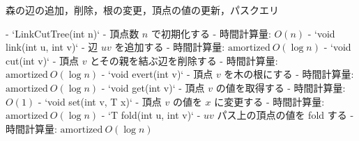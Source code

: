 \begin{small}
\begin{markdown}
森の辺の追加，削除，根の変更，頂点の値の更新，パスクエリ

- `LinkCutTree(int n)`
    - 頂点数 $n$ で初期化する
    - 時間計算量: $O(n)$
- `void link(int u, int v)`
    - 辺 $uv$ を追加する
    - 時間計算量: $\mathrm{amortized}\ O(\log n)$
- `void cut(int v)`
    - 頂点 $v$ とその親を結ぶ辺を削除する
    - 時間計算量: $\mathrm{amortized}\ O(\log n)$
- `void evert(int v)`
    - 頂点 $v$ を木の根にする
    - 時間計算量: $\mathrm{amortized}\ O(\log n)$
- `void get(int v)`
    - 頂点 $v$ の値を取得する
    - 時間計算量: $O(1)$
- `void set(int v, T x)`
    - 頂点 $v$ の値を $x$ に変更する
    - 時間計算量: $\mathrm{amortized}\ O(\log n)$
- `T fold(int u, int v)`
    - $uv$ パス上の頂点の値を fold する
    - 時間計算量: $\mathrm{amortized}\ O(\log n)$
\end{markdown}
\end{small}


